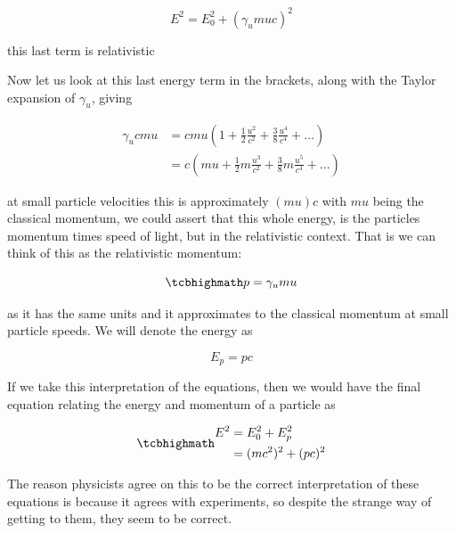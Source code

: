 \begin{equation}
	E^2 = E_0^2 + (\gamma_{u}{m}{u}{c})^2
\end{equation}

this last term is relativistic

Now let us look at this last energy term in the brackets, along with the Taylor expansion of $\gamma_{u}$, giving

\begin{equation}
	\begin{aligned}
		\gamma_{u} {c}{m}{u} & = {c}{m}{u} \left(1 + \frac{1}{2}\frac{u^2}{{c}^2} + \frac{3}{8}\frac{u^4}{c^4} + ...
		\right)                                                                                                   \\
		                 & ={c}\left( {m}{u} + \frac{1}{2}m \frac{u^3}{{c}^2} + \frac{3}{8}m\frac{u^5}{c^4} + ...
		\right)
	\end{aligned}
\end{equation}

at small particle velocities this is approximately $({m}{u}){c}$ with ${m}{u}$ being the classical momentum, we could assert that this whole energy, is the particles momentum times speed of light, but in the relativistic context.
That is we can think of this as the relativistic momentum:

\begin{equation}
	\mhl{
	p = \gamma_{u} {m}{u}
	}
\end{equation}

as it has the same units and it approximates to the classical momentum at small particle speeds.
We will denote the energy as

\begin{equation}
	E_p = p c
\end{equation}

If we take this interpretation of the equations, then we would have the final equation relating the energy and momentum of a particle as

\begin{equation}
	\mhl{
		\begin{aligned}
			E^2 & = E_0^2 + E_p^2   \\
			    & = (mc^2)^2 + (pc)^2
		\end{aligned}
	}
\end{equation}

The reason physicists agree on this to be the correct interpretation of these equations is because it agrees with experiments, so despite the strange way of getting to them, they seem to be correct.

